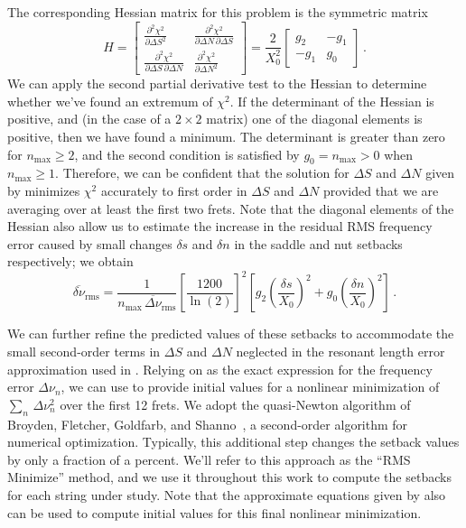 The corresponding Hessian matrix for this problem is the symmetric matrix
 \begin{equation}
H = \begin{bmatrix}
      \frac{\partial^2 \chi^2}{\partial \Delta S^2} & \frac{\partial^2 \chi^2}{\partial \Delta N\, \partial \Delta S} \\
      \frac{\partial^2 \chi^2}{\partial \Delta S\, \partial \Delta N} & \frac{\partial^2 \chi^2}{\partial \Delta N^2}
    \end{bmatrix}
  = \frac{2}{X_0^2} \begin{bmatrix}
      g_2 & -g_1 \\
      -g_1 & g_0
    \end{bmatrix}\, .
 \end{equation}
We can apply the second partial derivative test to the Hessian to determine whether we've found an extremum of $\chi^2$. If the determinant of the Hessian is positive, and (in the case of a $2 \times 2$ matrix) one of the diagonal elements is positive, then we have found a minimum. The determinant is greater than zero for $n_\text{max} \ge 2$, and the second condition is satisfied by $g_0 = n_\text{max} > 0$ when $n_\text{max} \ge 1$. Therefore, we can be confident that the solution for $\Delta S$ and $\Delta N$ given by  minimizes $\chi^2$ accurately to first order in $\Delta S$ and $\Delta N$ provided that we are averaging over at least the first two frets. Note that the diagonal elements of the Hessian also allow us to estimate the increase in the residual RMS frequency error caused by small changes $\delta s$ and $\delta n$ in the saddle and nut setbacks respectively; we obtain
\begin{equation}
  \overline{\delta \nu}_\text{rms} = \frac{1}{n_\text{max}\, \overline{\Delta \nu}_\text{rms}} \left[ \frac{1200}{\ln(2)} \right]^2 \left[ g_2 \left(\frac{\delta s}{X_0}\right)^2 + g_0 \left(\frac{\delta n}{X_0}\right)^2\right]\, .
\end{equation}

We can further refine the predicted values of these setbacks to accommodate the small second-order terms in $\Delta S$ and $\Delta N$ neglected in the resonant length error approximation used in . Relying on  as the exact expression for the frequency error $\Delta \nu_n$, we can use  to provide initial values for a nonlinear minimization of $\sum_n\, \Delta \nu_n^2$ over the first 12 frets. We adopt the quasi-Newton algorithm of Broyden, Fletcher, Goldfarb, and Shanno~\cite{ref:nocedal2006no}, a second-order algorithm for numerical optimization. Typically, this additional step changes the setback values by only a fraction of a percent. We'll refer to this approach as the ``RMS Minimize'' method, and we use it throughout this work to compute the setbacks for each string under study. Note that the approximate equations given by  also can be used to compute initial values for this final nonlinear minimization.

